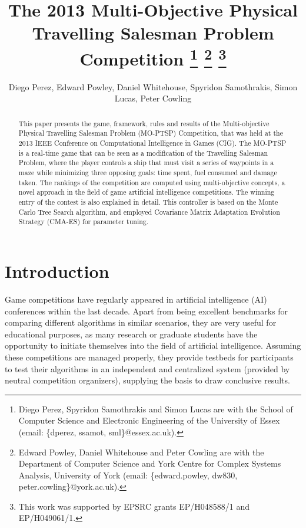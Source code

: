 \documentclass[conference]{IEEEtran}
\begin{document}
\title{The 2013 Multi-Objective Physical Travelling Salesman Problem Competition \thanks{Diego Perez, Spyridon Samothrakis and Simon Lucas are with the School of Computer Science and Electronic Engineering of the University of Essex (email: \{dperez, ssamot, sml\}@essex.ac.uk).} \thanks{Edward Powley, Daniel Whitehouse and Peter Cowling are with the Department of Computer Science and York Centre for Complex Systems Analysis, University of York (email:  \{\mbox{edward.powley}, \mbox{dw830}, \mbox{peter.cowling}\}@york.ac.uk).} \thanks{This work was supported by EPSRC grants EP/H048588/1 and EP/H049061/1.}}

\author{Diego Perez, Edward Powley, Daniel Whitehouse, Spyridon Samothrakis, Simon Lucas, Peter Cowling}


\maketitle

\begin{abstract}
This paper presents the game, framework, rules and results of the Multi-objective Physical Travelling Salesman Problem (MO-PTSP) Competition, that was held at the 2013 IEEE Conference on Computational Intelligence in Games (CIG). The MO-PTSP is a real-time game that can be seen as a modification of the Travelling Salesman Problem, where the player controls a ship that must visit a series of waypoints in a maze while minimizing three opposing goals: time spent, fuel consumed and damage taken. The rankings of the competition are computed using multi-objective concepts, a novel approach in the field of game artificial intelligence competitions. The winning entry of the contest is also explained in detail. This controller is based on the Monte Carlo Tree Search algorithm, and employed Covariance Matrix Adaptation Evolution Strategy (CMA-ES) for parameter tuning. 
\end{abstract}


\section{Introduction}

Game competitions have regularly appeared in artificial intelligence (AI) conferences within the last decade. Apart from being excellent benchmarks for comparing different algorithms in similar scenarios, they are very useful for educational purposes, as many research or graduate students have the opportunity to initiate themselves into the field of artificial intelligence. Assuming these competitions are managed properly, they provide testbeds for participants to test their algorithms in an independent and centralized system (provided by neutral competition organizers), supplying the basis to draw conclusive results.
\end{document}
